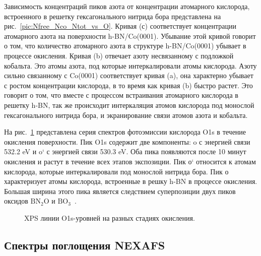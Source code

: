 Зависимость концентраций пиков азота от концентрации атомарного кислорода, встроенного в решетку гексагонального нитрида бора
представлена на рис.~\ref{pic:Nfree_Nco_Ntot_vs_O}. Кривая (с) соответствует концентрации атомарного азота на поверхности
h-BN/Co(0001). Убывание этой кривой говорит о том, что количество атомарного азота в структуре h-BN/Co(0001) убывает в процессе
окисления. Кривая (b) отвечает азоту несвязанному с подложкой кобальта. Это атомы азота, под которые интеркалировали атомы 
кислорода. Азоту сильно связанному с Co(0001) соответствует кривая (a), она характерно убывает с ростом концентрации
кислорода, в то время как кривая (b) быстро растет. Это говорит о том, что вместе с процессом встраивания атомарного кислорода
в решетку h-BN, так же происходит интеркаляция атомов кислорода под монослой гексагонального нитрида бора, и экранирование 
связи атомов азота и кобальта.


На рис.~\ref{pic:O1s_all} представлена серия спектров фотоэмиссии кислорода O1s в течение окисления поверхности.
Пик O1s содержит две компоненты: o с энергией связи 532.2 eV и o` с энергией связи 530.3 eV. Оба пика появляются
после 10 минут окисления и растут в течение всех этапов экспозиции. Пик о` относится к атомам кислорода, которые
интеркалировали под монослой нитрида бора. Пик о характеризует атомы кислорода, встроенные в решку h-BN в процессе
окисления. Большая ширина этого пика является следствием суперпозиции двух пиков оксидов $\mathrm{BN_2O}$ и
$\mathrm{BO_3}$~\cite{Shevelev2019_h-BN/Co_oxydation}. 
\begin{figure}[!ht]
\caption{XPS линии O1s-уровней на разных стадиях окисления.}
\label{pic:O1s_all}
\end{figure}


\subsection{Спектры поглощения NEXAFS}

